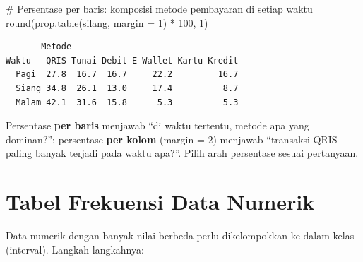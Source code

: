 \documentclass[
  indonesian,
  letterpaper,
]{book}
\newenvironment{Shaded}{\begin{snugshade}}{\end{snugshade}}
\newcommand{\AttributeTok}[1]{\textcolor[rgb]{0.40,0.45,0.13}{#1}}
\newcommand{\CommentTok}[1]{\textcolor[rgb]{0.37,0.37,0.37}{#1}}
\newcommand{\DecValTok}[1]{\textcolor[rgb]{0.68,0.00,0.00}{#1}}
\newcommand{\FunctionTok}[1]{\textcolor[rgb]{0.28,0.35,0.67}{#1}}
\newcommand{\NormalTok}[1]{\textcolor[rgb]{0.00,0.23,0.31}{#1}}
\newcommand{\SpecialCharTok}[1]{\textcolor[rgb]{0.37,0.37,0.37}{#1}}
\begin{document}
\begin{Shaded}
\begin{Highlighting}[]
\CommentTok{\# Persentase per baris: komposisi metode pembayaran di setiap waktu}
\FunctionTok{round}\NormalTok{(}\FunctionTok{prop.table}\NormalTok{(silang, }\AttributeTok{margin =} \DecValTok{1}\NormalTok{) }\SpecialCharTok{*} \DecValTok{100}\NormalTok{, }\DecValTok{1}\NormalTok{)}
\end{Highlighting}
\end{Shaded}

\begin{verbatim}
       Metode
Waktu   QRIS Tunai Debit E-Wallet Kartu Kredit
  Pagi  27.8  16.7  16.7     22.2         16.7
  Siang 34.8  26.1  13.0     17.4          8.7
  Malam 42.1  31.6  15.8      5.3          5.3
\end{verbatim}

Persentase \textbf{per baris} menjawab ``di waktu tertentu, metode apa
yang dominan?''; persentase \textbf{per kolom} (margin = 2) menjawab
``transaksi QRIS paling banyak terjadi pada waktu apa?''. Pilih arah
persentase sesuai pertanyaan.

\section{Tabel Frekuensi Data
Numerik}\label{tabel-frekuensi-data-numerik}

Data numerik dengan banyak nilai berbeda perlu dikelompokkan ke dalam
kelas (interval). Langkah-langkahnya:
\end{document}
